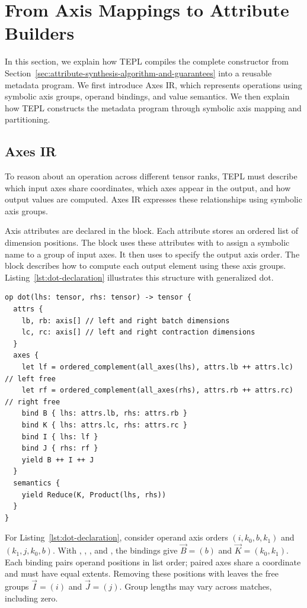 \section{From Axis Mappings to Attribute Builders}
\label{sec:axis-mappings-to-attribute-builders}

In this section, we explain how TEPL compiles the complete constructor from
Section~\ref{sec:attribute-synthesis-algorithm-and-guarantees} into a reusable metadata program.
We first introduce Axes IR, which represents operations using symbolic
axis groups, operand bindings, and value semantics. We then explain how
TEPL constructs the metadata program through symbolic axis mapping
and partitioning.

\subsection{Axes IR}
\label{sec:axes-ir}
To reason about an operation across different tensor ranks, TEPL must
describe which input axes share coordinates, which axes appear in the
output, and how output values are computed. Axes IR expresses these
relationships using symbolic axis groups.

Axis attributes are declared in the  block. Each
 attribute stores an ordered list of dimension positions.
The  block uses these attributes with  to assign
a symbolic name to a group of input axes. It then uses 
to specify the output axis order. The  block describes
how to compute each output element using these axis groups.
Listing~\ref{lst:dot-declaration} illustrates this structure with
generalized dot.

\begin{lstlisting}[language=TEPL,
  caption={Axes IR declaration for generalized dot.},
  label={lst:dot-declaration}]
op dot(lhs: tensor, rhs: tensor) -> tensor {
  attrs {
    lb, rb: axis[] // left and right batch dimensions
    lc, rc: axis[] // left and right contraction dimensions
  }
  axes {
    let lf = ordered_complement(all_axes(lhs), attrs.lb ++ attrs.lc) // left free
    let rf = ordered_complement(all_axes(rhs), attrs.rb ++ attrs.rc) // right free
    bind B { lhs: attrs.lb, rhs: attrs.rb }
    bind K { lhs: attrs.lc, rhs: attrs.rc }
    bind I { lhs: lf }
    bind J { rhs: rf }
    yield B ++ I ++ J
  }
  semantics {
    yield Reduce(K, Product(lhs, rhs))
  }
}
\end{lstlisting}

For Listing~\ref{lst:dot-declaration}, consider operand axis orders
$(i,k_0,b,k_1)$ and $(k_1,j,k_0,b)$.
With , , , and ,
the bindings give $\vec B=(b)$ and $\vec K=(k_0,k_1)$.
Each binding pairs operand positions in list order; paired axes share
a coordinate and must have equal extents.
Removing these positions with  leaves the
free groups $\vec I=(i)$ and $\vec J=(j)$.
Group lengths may vary across matches, including zero.


